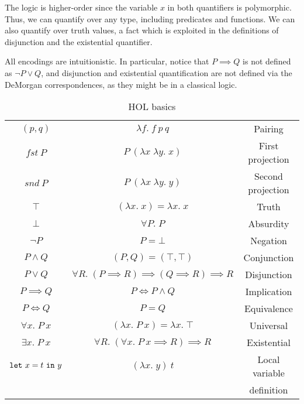 The logic is higher-order since the variable $x$ in both quantifiers is polymorphic. Thus, we can quantify over any type, including predicates and functions. We can also quantify over truth values, a fact which is exploited in the definitions of disjunction and the existential quantifier.

All encodings are intuitionistic. In particular, notice that \mbox{$P \implies Q$} is not defined as $\neg P \vee Q$, and disjunction and existential quantification are not defined via the DeMorgan correspondences, as they might be in a classical logic.

\begin{table}
\begin{center}
\begin{tabular}{|c|c|c|}
\hline
$(p,q)$          & $\lambda f.\; f\ p\ q$                  & Pairing\\
$fst\ P$         & $P\ (\lambda x\;\lambda y.\; x)$                & First projection\\
$snd\ P$         & $P\ (\lambda x\;\lambda y.\; y)$                & Second projection\\
$\top$           & $(\lambda x.\; x) = \lambda x.\; x$       & Truth\\
$\bot$           & $\forall P.\; P$                        & Absurdity\\
$\neg P$         & $P = \bot$                            & Negation\\
$P \wedge Q$     & $(P,Q) = (\top,\top)$                 & Conjunction\\
$P \vee Q$       & $\forall R.\; (P \implies R) \implies (Q \implies R) \implies R$  &Disjunction\\
$P \implies Q$   & $P \iff P \wedge Q$                   & Implication\\
$P \iff Q$       & $P = Q$                               & Equivalence\\
$\forall x.\; P\ x$ & $(\lambda x.\; P\ x) = \lambda x.\; \top$ & Universal\\
$\exists x.\; P\ x$ & $\forall R.\; (\forall x.\; P\ x \implies R) \implies R$ & Existential\\
$\code{let}\ x=t\ \code{in}\ y$ & $(\lambda x.\; y)\ t$ & Local variable\\
&& definition\\
\hline
\end{tabular}
\end{center}
\caption{HOL basics}
\label{table:HOL}
\end{table}

